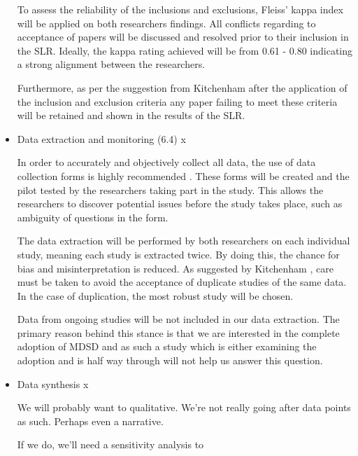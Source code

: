 \documentclass[10pt,twocolumn]{article}
\begin{document}
\begin{itemize}

To assess the reliability of the inclusions and exclusions, Fleiss' kappa index will be applied on both researchers findings. All conflicts regarding to acceptance of papers will be discussed and resolved prior to their inclusion in the SLR. Ideally, the kappa rating achieved will be from 0.61 - 0.80 indicating a strong alignment between the researchers. 

Furthermore, as per the suggestion from Kitchenham \cite{keele2007guidelines} after the application of the inclusion and exclusion criteria any paper failing to meet these criteria will be retained and shown in the results of the SLR.


\item Data extraction and monitoring (6.4) x

In order to accurately and objectively collect all data, the use of data collection forms is highly recommended \cite{keele2007guidelines}. These forms will be created and the pilot tested by the researchers taking part in the study. This allows the researchers to discover potential issues before the study takes place, such as ambiguity of questions in the form.

The data extraction will be performed by both researchers on each individual study, meaning each study is extracted twice. By doing this, the chance for bias and misinterpretation is reduced. As suggested by Kitchenham \cite{keele2007guidelines}, care must be taken to avoid the acceptance of duplicate studies of the same data. In the case of duplication, the most robust study will be chosen.

Data from ongoing studies will be not included in our data extraction. The primary reason behind this stance is that we are interested in the complete adoption of MDSD and as such a study which is either examining the adoption and is half way through will not help us answer this question.

\item Data synthesis x

We will probably want to qualitative. We're not really going after data points as such. Perhaps even a narrative.

If we do, we'll need a sensitivity analysis to 

\end{itemize}
\end{document}
